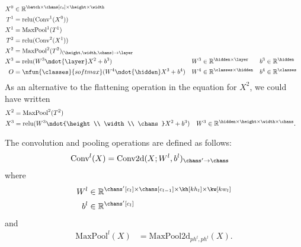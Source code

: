 \begin{align*}
X^0 &\in \reals^{\batch \times \chans[c_0] \times \height \times \width} \\
T^1 &= \text{relu}(\text{Conv}^1(X^0)) \\
X^1 &= \text{MaxPool}^1(T^1) \\
T^2 &= \text{relu}(\text{Conv}^2(X^1)) \\
X^2 &= \text{MaxPool}^2(T^2)_{(\height,\width,\chans)\rightarrow\layer} \\
X^3 &= \text{relu}(W^3 \ndot{\layer} X^2 + b^3) & W^3 &\in \reals^{\hidden \times \layer} & b^3 &\in \reals^{\hidden} \\
O &= \nfun{\classes}{softmax} (W^4 \ndot{\hidden} X^3 + b^4) & W^4 &\in \reals^{\classes \times \hidden} & b^4 &\in \reals^{\classes}
\end{align*}
As an alternative to the flattening operation in the equation for $X^2$, we could have written
\begin{align*}
X^2 &= \text{MaxPool}^2(T^2) \\
X^3 &= \text{relu}(W^3 \ndot{\height \\ \width \\ \chans} X^2 + b^3) & W^3 &\in \reals^{\hidden \times \height \times \width \times \chans}.
\end{align*}

The convolution and pooling operations are defined as follows:
\begin{align*}
\text{Conv}^l(X) &= \text{Conv2d}(X; W^l, b^l)_{\chans'\rightarrow\chans}
\end{align*}
where
\begin{align*}
W^l & \in \reals^{\chans'[c_l] \times \chans[c_{l-1}] \times \kh[kh_l] \times \kw[kw_l]} \\
b^l &\in \reals^{\chans'[c_l]}
\end{align*}
and
\begin{align*}
\text{MaxPool}^l(X) &= \text{MaxPool2d}_{ph^l,ph^l}(X).
\end{align*}
